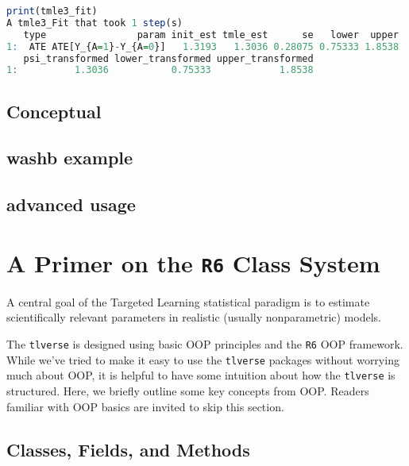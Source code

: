 \documentclass[
  12pt, krantz2,
]{krantz}
\newcommand{\passthrough}[1]{#1}
\theoremstyle{definition}
\theoremstyle{definition}
\theoremstyle{definition}
\newcommand{\1}{\mathbbm{1}}
\begin{document}
\begin{lstlisting}[language=R]
print(tmle3_fit)
A tmle3_Fit that took 1 step(s)
   type                param init_est tmle_est      se   lower  upper
1:  ATE ATE[Y_{A=1}-Y_{A=0}]   1.3193   1.3036 0.28075 0.75333 1.8538
   psi_transformed lower_transformed upper_transformed
1:          1.3036           0.75333            1.8538
\end{lstlisting}

\hypertarget{conceptual-2}{%
\section{Conceptual}\label{conceptual-2}}

\hypertarget{washb-example-2}{%
\section{washb example}\label{washb-example-2}}

\hypertarget{advanced-usage-2}{%
\section{advanced usage}\label{advanced-usage-2}}

\hypertarget{r6}{%
\chapter{\texorpdfstring{A Primer on the \texttt{R6} Class System}{A Primer on the R6 Class System}}\label{r6}}

A central goal of the Targeted Learning statistical paradigm is to estimate
scientifically relevant parameters in realistic (usually nonparametric) models.

The \passthrough{\lstinline!tlverse!} is designed using basic OOP principles and the \passthrough{\lstinline!R6!} OOP framework.
While we've tried to make it easy to use the \passthrough{\lstinline!tlverse!} packages without worrying
much about OOP, it is helpful to have some intuition about how the \passthrough{\lstinline!tlverse!} is
structured. Here, we briefly outline some key concepts from OOP. Readers
familiar with OOP basics are invited to skip this section.

\hypertarget{classes-fields-and-methods}{%
\section{Classes, Fields, and Methods}\label{classes-fields-and-methods}}
\end{document}
